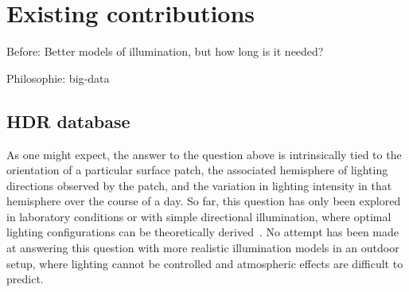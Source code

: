 \documentclass{report}
\begin{document}


\chapter{Existing contributions}
\label{}

Before: Better models of illumination, but how long is it needed?

Philosophie: big-data

\section{HDR database}

As one might expect, the answer to the question above is intrinsically tied to the orientation of a particular surface patch, the associated hemisphere of lighting directions observed by the patch, and the variation in lighting intensity in that hemisphere over the course of a day. So far, this question has only been explored in laboratory conditions or with simple directional illumination, where optimal lighting configurations can be theoretically derived~\cite{drbohlav-iccv-05,klaudiny-prl-14,shen-pg-14}. No attempt has been made at answering this question with more realistic illumination models in an outdoor setup, where lighting cannot be controlled and atmospheric effects are difficult to predict.
\end{document}
